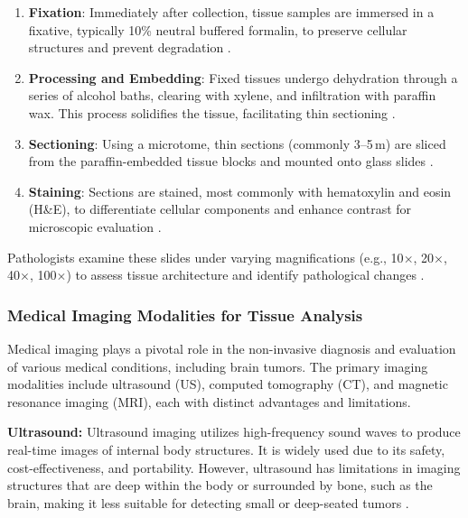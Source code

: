 \begin{enumerate}
  \item \textbf{Fixation}: Immediately after collection, tissue samples are immersed in a fixative, typically 10\% neutral buffered formalin, to preserve cellular structures and prevent degradation \cite{parry2024histology}.

  \item \textbf{Processing and Embedding}: Fixed tissues undergo dehydration through a series of alcohol baths, clearing with xylene, and infiltration with paraffin wax. This process solidifies the tissue, facilitating thin sectioning \cite{leica2012specimen}.

  \item \textbf{Sectioning}: Using a microtome, thin sections (commonly 3--5\,\textmu m) are sliced from the paraffin-embedded tissue blocks and mounted onto glass slides \cite{parry2024histology}.

  \item \textbf{Staining}: Sections are stained, most commonly with hematoxylin and eosin (H\&E), to differentiate cellular components and enhance contrast for microscopic evaluation \cite{leica2012staining}.
\end{enumerate}

Pathologists examine these slides under varying magnifications (e.g., 10$\times$, 20$\times$, 40$\times$, 100$\times$) to assess tissue architecture and identify pathological changes \cite{wikipedia2025histopathology}.


\subsubsection{Medical Imaging Modalities for Tissue Analysis}

Medical imaging plays a pivotal role in the non-invasive diagnosis and evaluation of various medical conditions, including brain tumors. The primary imaging modalities include ultrasound (US), computed tomography (CT), and magnetic resonance imaging (MRI), each with distinct advantages and limitations.

\textbf{Ultrasound:} Ultrasound imaging utilizes high-frequency sound waves to produce real-time images of internal body structures. It is widely used due to its safety, cost-effectiveness, and portability. However, ultrasound has limitations in imaging structures that are deep within the body or surrounded by bone, such as the brain, making it less suitable for detecting small or deep-seated tumors \cite{raybloc2023ultrasound}.

